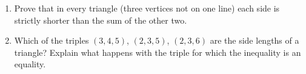 \begin{enumerate}
\item[(a)] Prove that in every triangle (three vertices not on one line) each side is strictly shorter than the sum of the other two.
\item[(b)] Which of the triples $(3,4,5)$, $(2,3,5)$, $(2,3,6)$ are the side lengths of a triangle? Explain what happens with the triple for which the inequality is an equality.
\end{enumerate}
